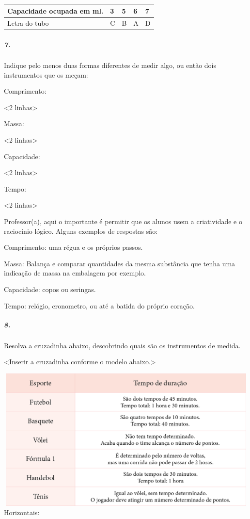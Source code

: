 \begin{longtable}[]{@{}lllll@{}}
\toprule
Capacidade ocupada em ml. & 3 & 5 & 6 & 7\tabularnewline
\midrule
\endhead
Letra do tubo & C & B & A & D\tabularnewline
\bottomrule
\end{longtable}

\subparagraph{7.}\label{section-34}

Indique pelo menos duas formas diferentes de medir algo, ou então dois
instrumentos que os meçam:

Comprimento:

\textless{}2 linhas\textgreater{}

Massa:

\textless{}2 linhas\textgreater{}

Capacidade:

\textless{}2 linhas\textgreater{}

Tempo:

\textless{}2 linhas\textgreater{}

Professor(a), aqui o importante é permitir que os alunos usem a
criatividade e o raciocínio lógico. Alguns exemplos de respostas são:

Comprimento: uma régua e os próprios passos.

Massa: Balança e comparar quantidades da mesma substância que tenha uma
indicação de massa na embalagem por exemplo.

Capacidade: copos ou seringas.

Tempo: relógio, cronometro, ou até a batida do próprio coração.

\subparagraph{8.}\label{section-35}

Resolva a cruzadinha abaixo, descobrindo quais são os instrumentos de
medida.

\textless{}Inserir a cruzadinha conforme o modelo abaixo.\textgreater{}

\includegraphics[width=6.14865in,height=2.84375in]{media/image48.png}Horizontais:

